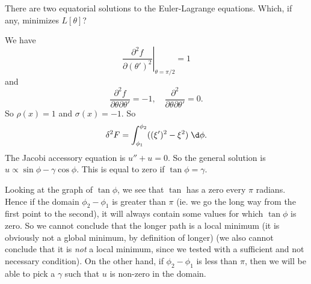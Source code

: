 \documentclass[a4paper]{article}
\begin{document}
\begin{eg}
  There are two equatorial solutions to the Euler-Lagrange equations. Which, if any, minimizes $L[\theta]$?
  \begin{center}
  \end{center}
  We have
  \[
    \left.\frac{\partial^2 f}{\partial (\theta')^2}\right|_{\theta = \pi/2} = 1
  \]
  and
  \[
    \frac{\partial^2 f}{\partial \theta \partial \theta'} = -1,\quad \frac{\partial^2}{\partial \theta\partial \theta'} = 0.
  \]
  So $\rho(x) = 1$ and $\sigma(x) = -1$. So
  \[
    \delta^2 F = \int_{\phi_1}^{\phi_2} ((\xi')^2 - \xi^2)\;\d \phi.
  \]
  The Jacobi accessory equation is $u'' + u = 0$. So the general solution is $u \propto \sin \phi - \gamma \cos\phi$. This is equal to zero if $\tan \phi = \gamma$.

  Looking at the graph of $\tan \phi$, we see that $\tan$ has a zero every $\pi$ radians. Hence if the domain $\phi_2 - \phi_1$ is greater than $\pi$ (ie. we go the long way from the first point to the second), it will always contain some values for which $\tan \phi$ is zero. So we cannot conclude that the longer path is a local minimum (it is obviously not a global minimum, by definition of longer) (we also cannot conclude that it is \emph{not} a local minimum, since we tested with a sufficient and not necessary condition). On the other hand, if $\phi_2 - \phi_1$ is less than $\pi$, then we will be able to pick a $\gamma$ such that $u$ is non-zero in the domain.
\end{eg}
\end{document}
